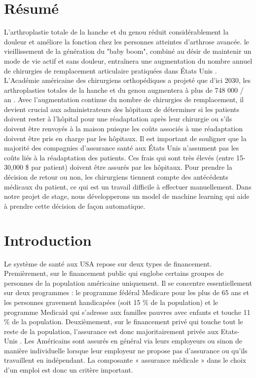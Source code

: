 \documentclass[12pt, french]{report}
\begin{document}
\newpage


\listoffigures

\newpage

\listoftables

\newpage

\chapter*{Résumé}
L'arthroplastie totale de la hanche et du genou réduit considérablement la douleur
et améliore la fonction chez les personnes atteintes d'arthrose avancée. le
vieillissement de la génération du "baby boom", combiné au désir de
maintenir un mode de vie actif et sans douleur, entraînera une augmentation
du nombre annuel de chirurgies de remplacement articulaire pratiquées dans
États Unis \cite{key2}. L'Académie américaine des chirurgiens orthopédiques a
projeté que d'ici 2030, les arthroplasties totales de la hanche et du genou
augmentera à plus de 748 000 / an \cite{key3}. 
Avec l'augmentation continue du nombre de chirurgies de remplacement, il devient crucial aux administrateurs des hôpitaux de déterminer si les patients doivent rester à l'hôpital pour une réadaptation après leur 	chirurgie ou s'ils doivent être renvoyés à la maison puisque les coûts associés à une réadaptation doivent être pris en charge par les hôpitaux. Il est important de souligner que la majorité des compagnies d'assurance santé aux États Unis n'assument pas les coûts liés à la réadaptation des patients. Ces frais qui sont très élevés (entre 15-30,000 \$ par patient) doivent être assurés par les hôpitaux. Pour prendre la décision de retour ou non, les chirurgiens tiennent compte des antécédents médicaux du patient, ce qui est un travail difficile à effectuer manuellement. Dans notre projet de stage, nous développerons un model de machine learning qui aide à prendre cette décision de façon automatique.
   	
\newpage
\chapter{Introduction}	
Le système de santé aux USA repose sur deux types de financement. Premièrement, sur le financement public qui englobe certains groupes de personnes de la population américaine uniquement. Il se concentre 	essentiellement sur deux programmes : le programme 		fédéral Medicare pour les plus de 65 ans et les personnes gravement handicapées (soit 15 \% de la population) et le programme Medicaid qui 			s’adresse aux familles pauvres avec enfants et touche 11 \% de la population. Deuxièmement, sur le financement privé qui touche tout le reste de la population, l’assurance est donc majoritairement privée aux 		Etats-Unis \cite{key4}. Les Américains sont assurés en général via leurs employeurs ou sinon de manière individuelle lorsque leur employeur ne propose pas d’assurance ou qu’ils travaillent en indépendant. La composante « 	assurance médicale » dans le choix d’un emploi est donc un critère important.\\
	
\end{document}
